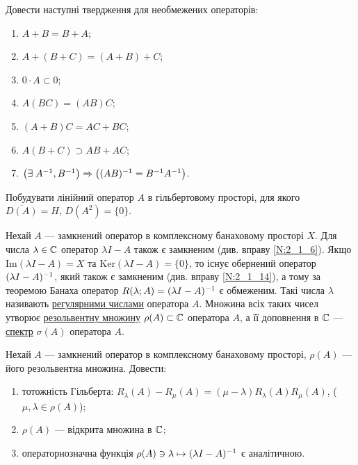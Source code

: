 
\begin{exercise}
    Довести наступні твердження для необмежених операторів:
    \begin{enumerate}
        \item $A + B = B + A$;
        \item $A + (B + C) = (A + B) + C$;
        \item $0 \cdot A \subset 0$;
        \item $A(BC) = (AB)C$;
        \item $(A+B)C = AC + BC$;
        \item $A(B+C) \supset AB + AC$;
        \item $\left( \exists \; A^{-1}, B^{-1} \right)  \Rightarrow 
               \left( (AB)^{-1} = B^{-1}A^{-1} \right)$.
    \end{enumerate}
\end{exercise}

\begin{exercise}\label{N:2_1_27}
    Побудувати лінійний оператор $A$ в гільбертовому просторі, для якого $\overline{D(A)} = H$,
    $D(A^2) = \{0\}$.
\end{exercise}

\begin{theory}
    Нехай $A$ --- замкнений оператор в комплексному банаховому просторі $X$.
    Для числа $\lambda \in \mathbb{C}$ оператор $\lambda I - A$ також є замкненим
    (див. вправу \ref{N:2_1_6}). Якщо $\mathrm{Im}(\lambda I - A) = X$ та 
    $\mathrm{Ker}(\lambda I - A) = \{0\}$, то існує обернений оператор $(\lambda I - A)^{-1}$,
    який також є замкненим (див. вправу \ref{N:2_1_14}), а тому за теоремою Банаха оператор
    $R(\lambda; A) = (\lambda I - A)^{-1}$ є обмеженим. Такі числа $\lambda$ називають
    \ul{регулярними числами} оператора $A$. Множина всіх таких чисел утворює 
    \ul{резольвентну множину} $\rho(A) \subset \mathbb{C}$ оператора $A$, а її доповнення
    в $\mathbb{C}$ --- \ul{спектр} $\sigma(A)$ оператора $A$.
\end{theory}

\begin{exercise}
    Нехай $A$ --- замкнений оператор в комплексному банаховому просторі, $\rho(A)$ --- його
    резольвентна множина. Довести:
    \begin{enumerate}
        \item тотожність Гільберта: $R_\lambda(A) - R_\mu(A) = (\mu - \lambda) R_\lambda(A)R_\mu(A)$,
        ($\mu, \lambda \in \rho(A)$);
        \item $\rho(A)$ --- відкрита множина в $\mathbb{C}$;
        \item операторнозначна функція $\rho(A) \ni \lambda \mapsto (\lambda I - A)^{-1}$ є аналітичною.
    \end{enumerate}
\end{exercise}

